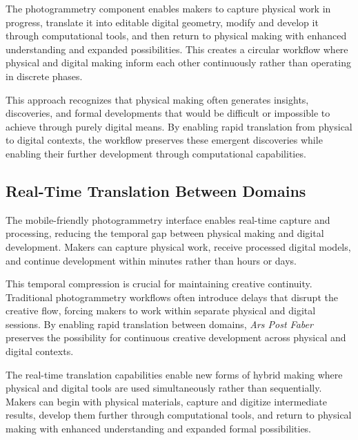 \vspace{0.5cm}

The photogrammetry component enables makers to capture physical work in progress, translate it into editable digital geometry, modify and develop it through computational tools, and then return to physical making with enhanced understanding and expanded possibilities. This creates a circular workflow where physical and digital making inform each other continuously rather than operating in discrete phases.

\vspace{0.5cm}

This approach recognizes that physical making often generates insights, discoveries, and formal developments that would be difficult or impossible to achieve through purely digital means. By enabling rapid translation from physical to digital contexts, the workflow preserves these emergent discoveries while enabling their further development through computational capabilities.

\subsection{Real-Time Translation Between Domains}

The mobile-friendly photogrammetry interface enables real-time capture and processing, reducing the temporal gap between physical making and digital development. Makers can capture physical work, receive processed digital models, and continue development within minutes rather than hours or days.

\vspace{0.5cm}

This temporal compression is crucial for maintaining creative continuity. Traditional photogrammetry workflows often introduce delays that disrupt the creative flow, forcing makers to work within separate physical and digital sessions. By enabling rapid translation between domains, \textit{Ars Post Faber} preserves the possibility for continuous creative development across physical and digital contexts.

\vspace{0.5cm}

The real-time translation capabilities enable new forms of hybrid making where physical and digital tools are used simultaneously rather than sequentially. Makers can begin with physical materials, capture and digitize intermediate results, develop them further through computational tools, and return to physical making with enhanced understanding and expanded formal possibilities.

